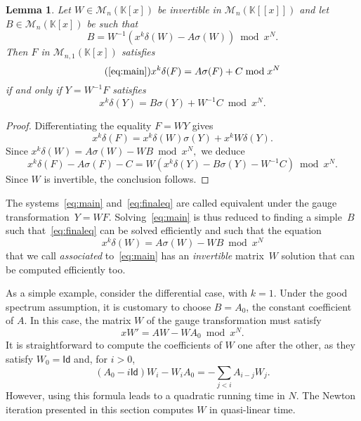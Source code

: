 \documentclass[]{sig-alternate}
\def\partial{\delta}
\def\K {\ensuremath{\mathbb{K}}}
\def\Id{\ensuremath{\mathsf{Id}}}
\def\mA {\ensuremath{{A}}}
\def\mB {\ensuremath{{B}}}
\def\mC {\ensuremath{{C}}}
\def\mF {\ensuremath{{F}}}
\def\mW {\ensuremath{{W}}}
\def\mY {\ensuremath{{Y}}}
\newtheorem{Lemma}{Lemma}
\begin{document}
\begin{Lemma}
Let $\mW\in\mathscr{M}_n(\K[x])$ be invertible in $\mathscr{M}_n(\K[[x]])$ and
let~$\mB\in\mathscr{M}_n(\K[x])$ be such that
\begin{equation}\label{eq:Wb}
\mB=\mW^{-1}(x^k \partial(\mW)-\mA \sigma(\mW)) \bmod x^N.
\end{equation}
Then $\mF$ in
  $\mathscr{M}_{n,1}(\K[x])$ satisfies
\begin{equation}\tag{\ref{eq:main}}
x^k\partial(\mF)=\mA\sigma(\mF) +\mC \bmod x^N
\end{equation} if and only if $\mY=\mW^{-1}\mF$ satisfies
\begin{equation}\label{eq:finaleq}
x^k\partial(\mY)=\mB\sigma(\mY)+ \mW^{-1}\mC  \bmod x^N.
\end{equation}
\end{Lemma}
\begin{proof}
Differentiating the equality $\mF=\mW \mY$ gives
$$x^k \partial(\mF) = x^k \partial(\mW) \sigma(\mY) + x^k \mW \partial(\mY).$$
Since 
$x^k\partial(\mW) = \mA \sigma(\mW)-\mW \mB \bmod x^N,$
we deduce
$$x^k \partial(\mF)-\mA \sigma(\mF) -\mC = \mW (x^k \partial(\mY) -\mB
\sigma(\mY) -\mW^{-1}\mC) \bmod x^N.$$
Since $\mW$ is invertible, the conclusion follows.
\end{proof}

The systems~\eqref{eq:main} and~\eqref{eq:finaleq} are called
equivalent under the gauge transformation~$Y=WF$.
Solving~\eqref{eq:main} is thus reduced to finding a simple~$\mB$ such
that~\eqref{eq:finaleq} can be solved efficiently and such that the
equation
\begin{equation}\label{eq:W}
x^k \partial(\mW)=\mA \sigma(\mW)-\mW \mB \bmod x^N
\end{equation}
that we call \emph{associated} to~\eqref{eq:main} has an
\emph{invertible} matrix~$\mW$ solution that can be computed
efficiently too.

As a simple example, consider the differential case, with $k=1$. Under
the good spectrum assumption, it is customary to choose $\mB=\mA_0$,
the constant coefficient of $\mA$. In this case, the matrix $W$ of the
gauge transformation must satisfy $$x \mW' = \mA\mW-\mW \mA_0 \bmod
x^N.$$ It is straightforward to compute the coefficients of $\mW$ one
after the other, as they satisfy $\mW_0=\Id$ and, for $i>0$,
$$(\mA_0- i \Id)\mW_i -\mW_i \mA_0 = -\sum_{j < i}\mA_{i-j} \mW_j.$$ However, using
this formula leads to a quadratic running time in $N$.  The Newton
iteration presented in this section computes $\mW$ in quasi-linear
time.
\end{document}
